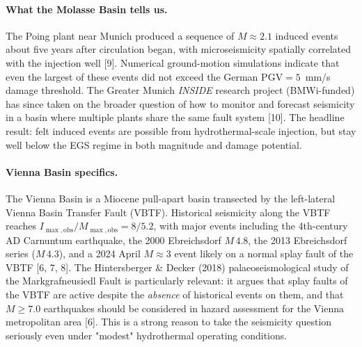 \documentclass{article}
\begin{document}
\paragraph{What the Molasse Basin tells us.}
The Poing plant near Munich produced a sequence of $M \approx 2.1$ induced
events about five years after circulation began, with microseismicity
spatially correlated with the injection well
[9]. Numerical ground-motion simulations indicate that
even the largest of these events did not exceed the German
$\mathrm{PGV} = 5$~mm/s damage threshold. The Greater Munich
\emph{INSIDE} research project (BMWi-funded) has since taken on the
broader question of how to monitor and forecast seismicity in a basin
where multiple plants share the same fault system [10].
The headline result: felt induced events are possible from
hydrothermal-scale injection, but stay well below the EGS regime in
both magnitude and damage potential.

\paragraph{Vienna Basin specifics.}
The Vienna Basin is a Miocene pull-apart basin transected by the
left-lateral Vienna Basin Transfer Fault (VBTF). Historical seismicity
along the VBTF reaches $I_{\max,\mathrm{obs}}/M_{\max,\mathrm{obs}} = 8/5.2$,
with major events including the 4th-century AD Carnuntum earthquake, the
2000 Ebreichsdorf $M\,4.8$, the 2013 Ebreichsdorf series ($M\,4.3$),
and a 2024 April $M\approx 3$ event likely on a normal splay fault
of the VBTF [6, 7, 8].
The Hintersberger \& Decker (2018) palaeoseismological study of the
Markgrafneusiedl Fault is particularly relevant: it argues that splay
faults of the VBTF are active despite the \emph{absence} of historical
events on them, and that $M \geq 7.0$ earthquakes should be considered
in hazard assessment for the Vienna metropolitan area [6].
This is a strong reason to take the seismicity question seriously even
under "modest" hydrothermal operating conditions.
\end{document}
